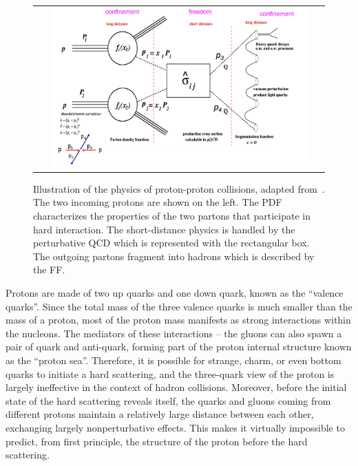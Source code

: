 \begin{figure}[tbh!]
 \begin{center}
 \begin{tabular}{c}
 \includegraphics[width=0.9\textwidth]{figures/Part1/QCD/factorization}
 \end{tabular}
 \caption{Illustration of the physics of proton-proton collisions, adapted from~\cite{Huston:fact}. The two incoming protons are shown on the left. The \ac{PDF} characterizes the properties of the two partons that participate in hard interaction. The short-distance physics is handled by the perturbative \ac{QCD} which is represented with the rectangular box. The outgoing partons fragment into hadrons which is described by the \ac{FF}.}
 \label{fig:factorization}
 \end{center}
\end{figure}

Protons are made of two up quarks and one down quark, known as the ``valence quarks''. Since the total mass of the three valence quarks is much smaller than the mass of a proton, most of the proton mass manifests as strong interactions within the nucleons. The mediators of these interactions -- the gluons can also spawn a pair of quark and anti-quark, forming part of the proton internal structure known as the ``proton sea''. Therefore, it is possible for strange, charm, or even bottom quarks to initiate a hard scattering, and the three-quark view of the proton is largely ineffective in the context of hadron collisions. Moreover, before the initial state of the hard scattering reveals itself, the quarks and gluons coming from different protons maintain a relatively large distance between each other, exchanging largely nonperturbative effects. This makes it virtually impossible to predict, from first principle, the structure of the proton before the hard scattering. 


